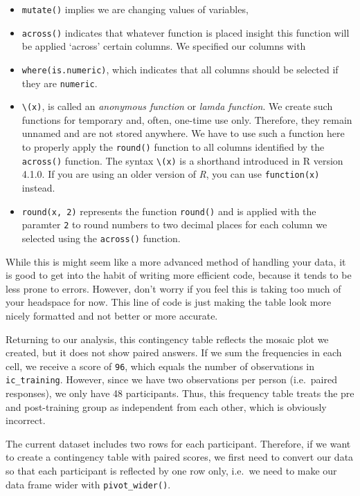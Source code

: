 \documentclass[
  letterpaper,
  DIV=11,
  numbers=noendperiod]{scrreprt}
\begin{document}
\begin{itemize}
\item
  \texttt{mutate()} implies we are changing values of variables,
\item
  \texttt{across()} indicates that whatever function is placed insight
  this function will be applied `across' certain columns. We specified
  our columns with
\item
  \texttt{where(is.numeric)}, which indicates that all columns should be
  selected if they are \texttt{numeric}.
\item
  \texttt{\textbackslash{}(x)}, is called an \emph{anonymous function}
  or \emph{lamda function}. We create such functions for temporary and,
  often, one-time use only. Therefore, they remain unnamed and are not
  stored anywhere. We have to use such a function here to properly apply
  the \texttt{round()} function to all columns identified by the
  \texttt{across()} function. The syntax \texttt{\textbackslash{}(x)} is
  a shorthand introduced in R version 4.1.0. If you are using an older
  version of \emph{R}, you can use \texttt{function(x)} instead.
\item
  \texttt{round(x,\ 2)} represents the function \texttt{round()} and is
  applied with the paramter \texttt{2} to round numbers to two decimal
  places for each column we selected using the \texttt{across()}
  function.
\end{itemize}

While this is might seem like a more advanced method of handling your
data, it is good to get into the habit of writing more efficient code,
because it tends to be less prone to errors. However, don't worry if you
feel this is taking too much of your headspace for now. This line of
code is just making the table look more nicely formatted and not better
or more accurate.

Returning to our analysis, this contingency table reflects the mosaic
plot we created, but it does not show paired answers. If we sum the
frequencies in each cell, we receive a score of \texttt{96}, which
equals the number of observations in \texttt{ic\_training}. However,
since we have two observations per person (i.e.~paired responses), we
only have 48 participants. Thus, this frequency table treats the pre and
post-training group as independent from each other, which is obviously
incorrect.

The current dataset includes two rows for each participant. Therefore,
if we want to create a contingency table with paired scores, we first
need to convert our data so that each participant is reflected by one
row only, i.e.~we need to make our data frame wider with
\texttt{pivot\_wider()}.
\end{document}
